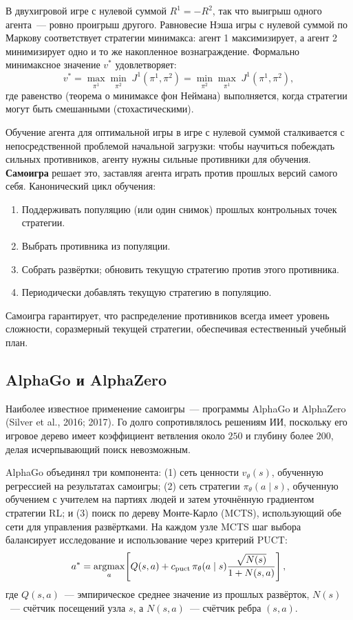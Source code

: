В двухигровой игре с нулевой суммой $R^1 = -R^2$, так что выигрыш одного агента~---
ровно проигрыш другого. Равновесие Нэша игры с нулевой суммой по Маркову
соответствует стратегии минимакса: агент 1 максимизирует, а агент
2 минимизирует одно и то же накопленное вознаграждение. Формально минимаксное значение
$v^*$ удовлетворяет:
\[
  v^* = \max_{\pi^1} \min_{\pi^2}\; J^1(\pi^1, \pi^2)
       = \min_{\pi^2} \max_{\pi^1}\; J^1(\pi^1, \pi^2),
\]
где равенство (теорема о минимаксе фон Неймана)
выполняется, когда стратегии могут быть смешанными (стохастическими).

Обучение агента для оптимальной игры в игре с нулевой суммой сталкивается с
непосредственной проблемой начальной загрузки: чтобы научиться побеждать сильных противников,
агенту нужны сильные противники для обучения. \textbf{Самоигра}
 решает это, заставляя агента играть против
прошлых версий самого себя. Канонический цикл обучения:
\begin{enumerate}[leftmargin=*]
  \item Поддерживать популяцию (или один снимок) прошлых контрольных точек стратегии.
  \item Выбрать противника из популяции.
  \item Собрать развёртки; обновить текущую стратегию против этого
    противника.
  \item Периодически добавлять текущую стратегию в популяцию.
\end{enumerate}
Самоигра гарантирует, что распределение противников всегда имеет
уровень сложности, соразмерный текущей стратегии, обеспечивая
естественный учебный план.

\subsection{AlphaGo и AlphaZero}

Наиболее известное применение самоигры~--- программы AlphaGo и
AlphaZero (Silver et al., 2016;
2017). Го долго сопротивлялось решениям ИИ, поскольку его
игровое дерево имеет коэффициент ветвления около $250$ и глубину более
$200$, делая исчерпывающий поиск невозможным.

AlphaGo объединял три компонента: (1) сеть ценности $v_\theta(s)$,
обученную регрессией на результатах самоигры; (2) сеть стратегии
$\pi_\theta(a \mid s)$, обученную обучением с учителем на партиях людей
и затем уточнённую градиентом стратегии RL; и (3) поиск по дереву Монте-Карло
(MCTS), использующий обе сети для управления развёртками.
На каждом узле MCTS шаг выбора балансирует исследование и
использование через критерий PUCT:
\begin{equation}
\label{eq:puct}
a^* = \operatorname*{argmax}_{a}\!\left[
  Q(s, a) + c_\mathrm{puct}\, \pi_\theta(a \mid s)
  \frac{\sqrt{N(s)}}{1 + N(s, a)}
\right],
\end{equation}
где $Q(s,a)$~--- эмпирическое среднее значение из прошлых развёрток,
$N(s)$~--- счётчик посещений узла $s$, а $N(s,a)$~--- счётчик
ребра $(s,a)$.

